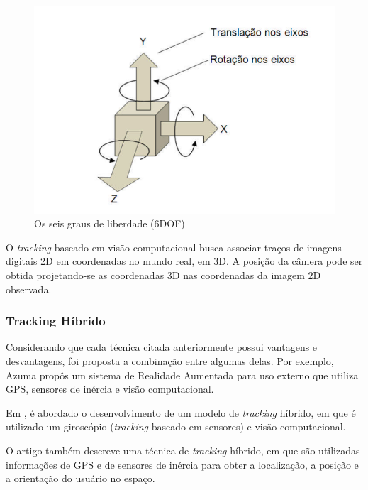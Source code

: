\begin{figure}[h!]
    \centering
    \caption{Os seis graus de liberdade (6DOF)}
    \label{fig:6dof_data}
    \includegraphics[width=15cm]{resources/6DoF-ptbr.png}
\end{figure}



O \textit{tracking} baseado em visão computacional busca associar traços de imagens 
digitais 2D em coordenadas no mundo real, em 3D.
A posição da câmera pode ser obtida projetando-se as coordenadas 3D nas coordenadas
da imagem 2D observada.    



\subsubsection{Tracking Híbrido}

Considerando que cada técnica citada anteriormente possui vantagens e desvantagens, 
foi proposta a combinação entre algumas delas. Por exemplo, Azuma\cite{SurveyAR}
propôs um sistema de Realidade Aumentada para uso externo que utiliza \gls{GPS}, 
sensores de inércia e visão computacional.

Em \cite{HybridTrackingOutdoorAR}, é abordado o desenvolvimento de um modelo de \textit{tracking}
híbrido, em que é utilizado um giroscópio (\textit{tracking} baseado em sensores)
e visão computacional.

O artigo \cite{HybridTrackingForGIS} também descreve uma técnica de \textit{tracking} híbrido,
em que são utilizadas informações de \gls{GPS} e de sensores de inércia para obter a localização,
a posição e a orientação do usuário no espaço.







